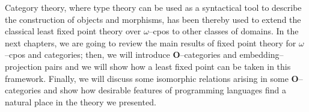 Category theory, where type theory can be used as a syntactical tool to describe the construction of objects and morphisms, has been thereby used to extend the classical least fixed point theory over \(\omega\)--cpos to other classes of domains.
%
%
In the next chapters, we are going to review the main results of fixed point theory for \(\omega\)--cpos and categories; then, we will introduce \(\mathbf{O}\)--categories and embedding--projection pairs and we will show how a least fixed point can be taken in this framework.
Finally, we will discuss some isomorphic relations arising in some \(\mathbf{O}\)--categories and show how desirable features of programming languages find a natural place in the theory we presented.
